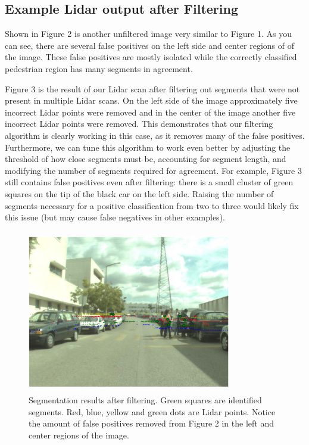 \documentclass[10pt,twocolumn,letterpaper]{article}
\begin{document}
  \subsection{Example Lidar output after Filtering}
  Shown in Figure 2 is another unfiltered image very similar to Figure 1. As you can see,
  there are several false positives on the left side and center regions of of the image.
  These false positives are mostly isolated while the correctly classified pedestrian
  region has many segments in agreement.

  Figure 3 is the result of our Lidar scan after filtering out segments
  that were not present in multiple Lidar scans. On the left side of the image
  approximately five incorrect Lidar points were removed and in the center of
  the image another five incorrect Lidar points were removed. This demonstrates that
  our filtering algorithm is clearly working in this case, as it removes many
  of the false positives. Furthermore, we can tune this algorithm to work
  even better by adjusting the threshold of how close segments must be,
  accounting for segment length, and modifying the number of segments required for
  agreement. For example, Figure 3 still contains false positives even after filtering:
  there is a small cluster of green squares on the tip of the black car on the left
  side. Raising the number of segments necessary for a positive classification from two
  to three would likely fix this issue (but may cause false negatives in other examples).

  \begin{figure}
    \includegraphics[height=2.8in, width=3.5in]{images/filterSampleResults.png}
    \caption{ Segmentation results after filtering. Green squares are identified
    segments. Red, blue, yellow and green dots are Lidar points. Notice the
    amount of false positives removed from Figure 2 in the left and center
    regions of the image.}
  \end{figure}
\end{document}
